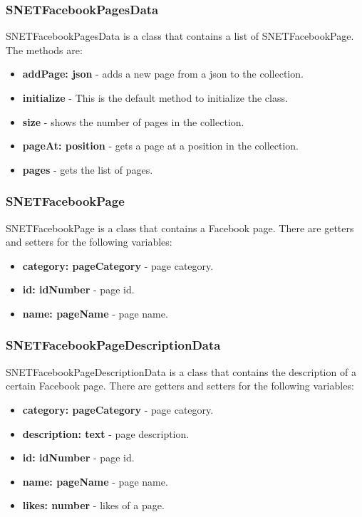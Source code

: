 \subsubsection{SNETFacebookPagesData}
\label{sec-1-5-6}
SNETFacebookPagesData is a class that contains a list of SNETFacebookPage. The methods are:
\begin{itemize}
\item \textbf{addPage: json} - adds a new page from a json to the collection.
\item \textbf{initialize} - This is the default method to initialize the class.
\item \textbf{size} - shows the number of pages in the collection.
\item \textbf{pageAt: position} - gets a page at a position in the collection.
\item \textbf{pages} - gets the list of pages.
\end{itemize}

\subsubsection{SNETFacebookPage}
\label{sec-1-5-7}
SNETFacebookPage is a class that contains a Facebook page. There are getters and setters for the following variables:
\begin{itemize}
\item \textbf{category: pageCategory} - page category.
\item \textbf{id: idNumber} - page id.
\item \textbf{name: pageName} - page name.
\end{itemize}


\subsubsection{SNETFacebookPageDescriptionData}
\label{sec-1-5-8}
SNETFacebookPageDescriptionData is a class that contains the description of a certain Facebook page. There are getters and setters for the following variables:
\begin{itemize}
\item \textbf{category: pageCategory} - page category.
\item \textbf{description: text} - page description.
\item \textbf{id: idNumber} - page id.
\item \textbf{name: pageName} - page name.
\item \textbf{likes: number} - likes of a page.
\end{itemize}


